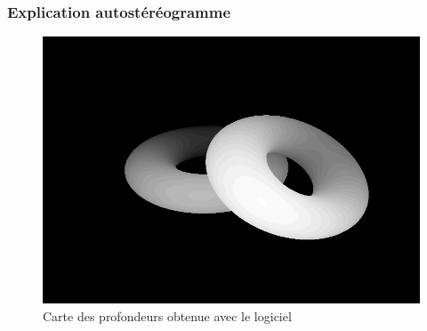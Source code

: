 \documentclass{beamer}
\begin{document}
%
\begin{frame}
\frametitle{Explication autostéréogramme}

\begin{figure}
\centering
\includegraphics[scale=0.22]{donutdepth.png}
\caption{Carte des profondeurs obtenue avec le logiciel}
\end{figure}
\end{frame}
\end{document}
